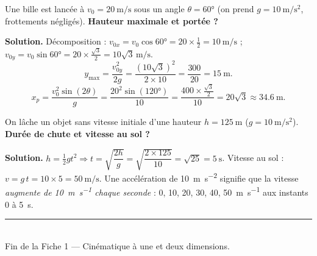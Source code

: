 \documentclass[11pt,a4paper]{article}
\newcommand{\ms}{\si{\metre\per\second}}
\begin{document}
\begin{exemple}
Une bille est lancée à $v_0=\qty{20}{\metre\per\second}$ sous un angle $\theta=\ang{60}$
(on prend $g=\qty{10}{\metre\per\second\squared}$, frottements négligés). \textbf{Hauteur maximale et portée ?}

\textbf{Solution.} Décomposition :
$v_{0x}=v_0\cos\ang{60}=20\times\tfrac12=\qty{10}{\metre\per\second}$ ;
$v_{0y}=v_0\sin\ang{60}=20\times\tfrac{\sqrt3}{2}=10\sqrt3\,\ms$.
\[ y_{\max}=\frac{v_{0y}^2}{2g}=\frac{(10\sqrt3)^2}{2\times10}=\frac{300}{20}=\qty{15}{\metre}. \]
\[ x_p=\frac{v_0^2\sin(2\theta)}{g}=\frac{20^2\sin(\ang{120})}{10}
      =\frac{400\times\frac{\sqrt3}{2}}{10}=20\sqrt3\approx\qty{34,6}{\metre}. \]
\end{exemple}

\begin{exemple}
On lâche un objet sans vitesse initiale d'une hauteur $h=\qty{125}{\metre}$
($g=\qty{10}{\metre\per\second\squared}$). \textbf{Durée de chute et vitesse au sol ?}

\textbf{Solution.} $h=\tfrac12 g t^2 \Rightarrow t=\sqrt{\dfrac{2h}{g}}=\sqrt{\dfrac{2\times125}{10}}=\sqrt{25}=\qty{5}{\second}$.
Vitesse au sol : $v=g\,t=10\times5=\qty{50}{\metre\per\second}$.
Une accélération de \qty{10}{\metre\per\second\squared} signifie que la vitesse \emph{augmente de
\qty{10}{\metre\per\second} chaque seconde} : \num{0}, \num{10}, \num{20}, \num{30}, \num{40}, \qty{50}{\metre\per\second} aux instants
\num{0} à \qty{5}{\second}.
\end{exemple}

\vfill
\begin{center}
\textcolor{primary}{\rule{0.5\textwidth}{1pt}}\\[4pt]
{\small\color{black!60}Fin de la Fiche 1 — Cinématique à une et deux dimensions.}
\end{center}
\end{document}
